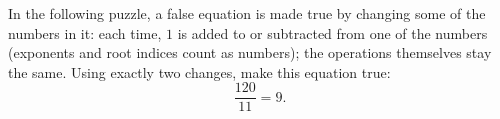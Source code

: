 In the following puzzle, a false equation is made true by changing some of the numbers in it: each time, $1$ is added to or subtracted from one of the numbers (exponents and root indices count as numbers); the operations themselves stay the same. Using exactly two changes, make this equation true:
\[\dfrac{120}{11}=9.\]

